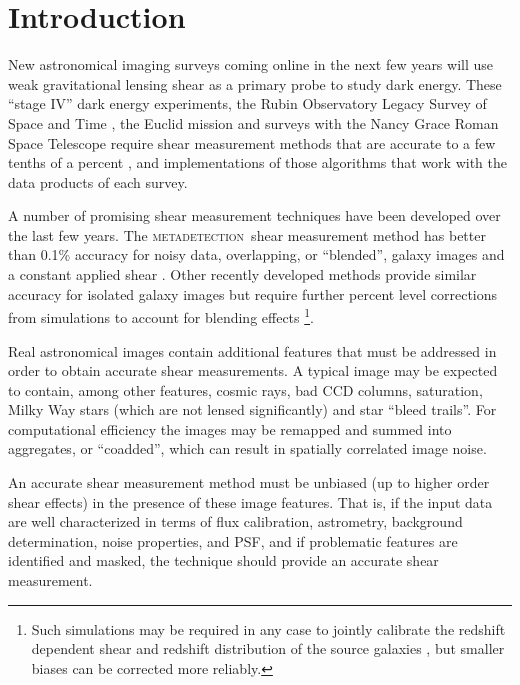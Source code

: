 \documentclass[twocolumn,twocolappendix,astrosym]{openjournal}
\newcommand{\mdet}{\textsc{metadetection}}
\begin{document}
\section{Introduction} \label{sec:intro}

New astronomical imaging surveys coming online in the next few years will use
weak gravitational lensing shear as a primary probe to study dark energy.
These ``stage IV'' dark energy experiments, the Rubin Observatory Legacy Survey
of Space and Time \citep[LSST,][]{IvezicLSST2008}, the Euclid mission
\citep{Euclid2011} and surveys with the Nancy Grace Roman Space Telescope
\citep{Roman2015,AkesonRoman2019} require shear measurement methods that are
accurate to a few tenths of a percent \citep{Massey2013,SRD}, and
implementations of those algorithms that work with the data products of each
survey.

A number of promising shear measurement techniques have been developed over the
last few years.  The \mdet\ shear measurement method \citep{mdet20} has better
than 0.1\% accuracy for noisy data, overlapping, or ``blended'', galaxy images
and a constant applied shear
\citep{mdet20,HoekstraMdet2021a,HoekstraMdet2021b}.  Other recently developed
methods provide similar accuracy for isolated galaxy images \citep{BernBFD2016,
LiFPFSBlending2022} but require further percent level corrections from
simulations to account for blending effects
\citep{mdet20,LiFPFSBlending2022}\footnote{Such simulations may be required in
any case to jointly calibrate the redshift dependent shear and redshift
distribution of the source galaxies \citep{MacCrann2022,LiNofz2022}, but
smaller biases can be corrected more reliably.}.

Real astronomical images contain additional features that must be addressed in
order to obtain accurate shear measurements.  A typical image may be expected
to contain, among other features, cosmic rays, bad CCD columns, saturation,
Milky Way stars (which are not lensed significantly) and star ``bleed trails''.
For computational efficiency the images may be remapped and summed into
aggregates, or ``coadded'', which can result in spatially correlated image
noise.

An accurate shear measurement method must be unbiased (up to higher order shear
effects) in the presence of these image features.  That is, if the input data
are well characterized in terms of flux calibration, astrometry, background
determination, noise properties, and PSF, and if problematic features are
identified and masked, the technique should provide an accurate shear
measurement.
\end{document}
